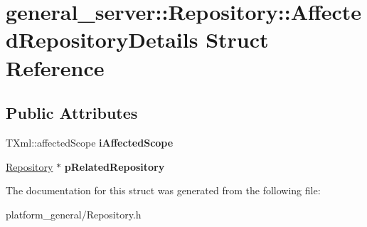 \hypertarget{structgeneral__server_1_1Repository_1_1AffectedRepositoryDetails}{\section{general\-\_\-server\-:\-:\-Repository\-:\-:\-Affected\-Repository\-Details \-Struct \-Reference}
\label{structgeneral__server_1_1Repository_1_1AffectedRepositoryDetails}
}
\subsection*{\-Public \-Attributes}
\begin{DoxyCompactItemize}
\item 
\hypertarget{structgeneral__server_1_1Repository_1_1AffectedRepositoryDetails_a2a792b5ae58b3e49c3bda47f7ada80d5}{\-T\-Xml\-::affected\-Scope {\bfseries i\-Affected\-Scope}}\label{structgeneral__server_1_1Repository_1_1AffectedRepositoryDetails_a2a792b5ae58b3e49c3bda47f7ada80d5}

\item 
\hypertarget{structgeneral__server_1_1Repository_1_1AffectedRepositoryDetails_ae36376e65f070e4909da5193c1527e75}{\hyperlink{classgeneral__server_1_1Repository}{\-Repository} $\ast$ {\bfseries p\-Related\-Repository}}\label{structgeneral__server_1_1Repository_1_1AffectedRepositoryDetails_ae36376e65f070e4909da5193c1527e75}

\end{DoxyCompactItemize}


\-The documentation for this struct was generated from the following file\-:\begin{DoxyCompactItemize}
\item 
platform\-\_\-general/\-Repository.\-h\end{DoxyCompactItemize}
